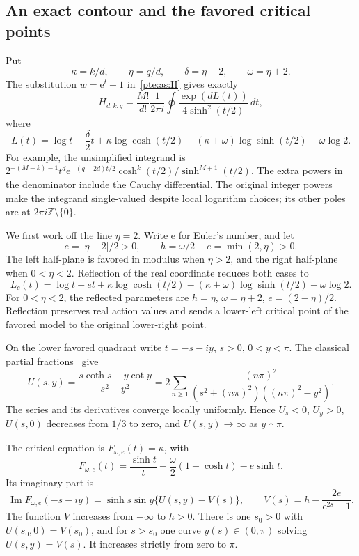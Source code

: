 \documentclass[11pt,a4paper]{article}
\numberwithin{equation}{section}
\theoremstyle{definition}
\theoremstyle{plain}
\newcommand{\ee}{\mathrm e}
\begin{document}
\subsection{An exact contour and the favored critical points}
Put
\[
 \kappa=k/d,\qquad \eta=q/d,\qquad \delta=\eta-2,\qquad \omega=\eta+2.
\]
The substitution $w=\ee^t-1$ in~\eqref{pte:as:H} gives exactly
\begin{equation}\label{pte:as:contour}
 H_{d,k,q}=\frac{M!}{d!}\frac1{2\pi i}
       \oint\frac{\exp(dL(t))}{4\sinh^2(t/2)}\,dt,
\end{equation}
where
\begin{equation}\label{pte:as:action}
 L(t)=\log t-\frac\delta2t+\kappa\log\cosh(t/2)
       -(\kappa+\omega)\log\sinh(t/2)-\omega\log2.
\end{equation}
For example, the unsimplified integrand is
$2^{-(M-k)-1}t^d\ee^{-(q-2d)t/2}\cosh^k(t/2)/\sinh^{M+1}(t/2)$.
The extra powers in the denominator include the Cauchy differential. The original integer powers make the integrand single-valued despite local logarithm choices; its other poles are at $2\pi i\mathbb Z\setminus\{0\}$.

We first work off the line $\eta=2$. Write $\ee$ for Euler's number, and let
\[
 e=|\eta-2|/2>0,\qquad h=\omega/2-e=\min(2,\eta)>0.
\]
The left half-plane is favored in modulus when $\eta>2$, and the right half-plane when $0<\eta<2$. Reflection of the real coordinate reduces both cases to
\begin{equation}\label{pte:as:centered}
 L_c(t)=\log t-et+\kappa\log\cosh(t/2)
                 -(\kappa+\omega)\log\sinh(t/2)-\omega\log2.
\end{equation}
For $0<\eta<2$, the reflected parameters are $h=\eta$, $\omega=\eta+2$, $e=(2-\eta)/2$. Reflection preserves real action values and sends a lower-left critical point of the favored model to the original lower-right point.

On the lower favored quadrant write $t=-s-iy$, $s>0$, $0<y<\pi$. The classical partial fractions~\cite{pte-dlmf4} give
\begin{equation}\label{pte:as:U}
 U(s,y)=\frac{s\coth s-y\cot y}{s^2+y^2}
 =2\sum_{n\ge1}\frac{(n\pi)^2}
 {(s^2+(n\pi)^2)((n\pi)^2-y^2)}.
\end{equation}
The series and its derivatives converge locally uniformly. Hence $U_s<0$, $U_y>0$, $U(s,0)$ decreases from $1/3$ to zero, and $U(s,y)\to\infty$ as $y\uparrow\pi$.

The critical equation is $F_{\omega,e}(t)=\kappa$, with
\[
 F_{\omega,e}(t)=\frac{\sinh t}{t}-\frac\omega2(1+\cosh t)-e\sinh t.
\]
Its imaginary part is
\begin{equation}\label{pte:as:imaginary}
 \operatorname{Im}F_{\omega,e}(-s-iy)
 =\sinh s\sin y\{U(s,y)-V(s)\},\qquad
 V(s)=h-\frac{2e}{\ee^{2s}-1}.
\end{equation}
The function $V$ increases from $-\infty$ to $h>0$. There is one $s_0>0$ with $U(s_0,0)=V(s_0)$, and for $s>s_0$ one curve $y(s)\in(0,\pi)$ solving $U(s,y)=V(s)$. It increases strictly from zero to $\pi$.
\end{document}
